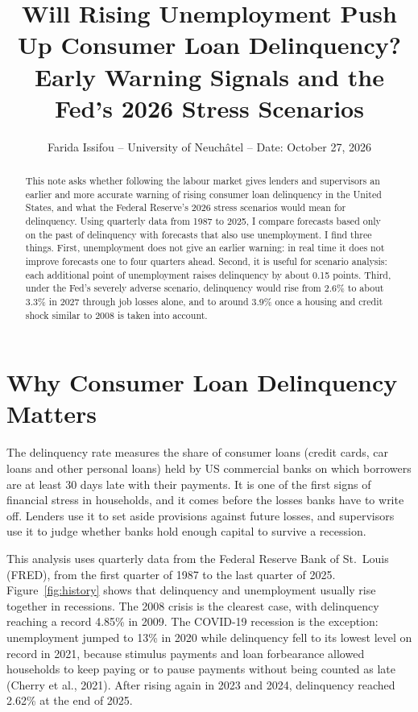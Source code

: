 \documentclass[11pt]{article}
\title{\vspace{-1.8cm}\Large Will Rising Unemployment Push Up Consumer Loan Delinquency?\\[2pt]
\large Early Warning Signals and the Fed's 2026 Stress Scenarios}
\author{Farida Issifou -- University of Neuchâtel -- Date: October 27, 2026}
\date{}
\begin{document}
\maketitle
\vspace{-1cm}

\begin{abstract}
\noindent This note asks whether following the labour market gives lenders and supervisors an earlier and more accurate warning of rising consumer loan delinquency in the United States, and what the Federal Reserve's 2026 stress scenarios would mean for delinquency. Using quarterly data from 1987 to 2025, I compare forecasts based only on the past of delinquency with forecasts that also use unemployment. I find three things. First, unemployment does not give an earlier warning: in real time it does not improve forecasts one to four quarters ahead. Second, it is useful for scenario analysis: each additional point of unemployment raises delinquency by about 0.15 points. Third, under the Fed's severely adverse scenario, delinquency would rise from 2.6\% to about 3.3\% in 2027 through job losses alone, and to around 3.9\% once a housing and credit shock similar to 2008 is taken into account.
\end{abstract}

\section*{Why Consumer Loan Delinquency Matters}

The delinquency rate measures the share of consumer loans (credit cards, car loans and other personal loans) held by US commercial banks on which borrowers are at least 30 days late with their payments. It is one of the first signs of financial stress in households, and it comes before the losses banks have to write off. Lenders use it to set aside provisions against future losses, and supervisors use it to judge whether banks hold enough capital to survive a recession.

This analysis uses quarterly data from the Federal Reserve Bank of St.\ Louis (FRED), from the first quarter of 1987 to the last quarter of 2025. Figure~\ref{fig:history} shows that delinquency and unemployment usually rise together in recessions. The 2008 crisis is the clearest case, with delinquency reaching a record 4.85\% in 2009. The COVID-19 recession is the exception: unemployment jumped to 13\% in 2020 while delinquency fell to its lowest level on record in 2021, because stimulus payments and loan forbearance allowed households to keep paying or to pause payments without being counted as late (Cherry et al., 2021). After rising again in 2023 and 2024, delinquency reached 2.62\% at the end of 2025.
\end{document}

